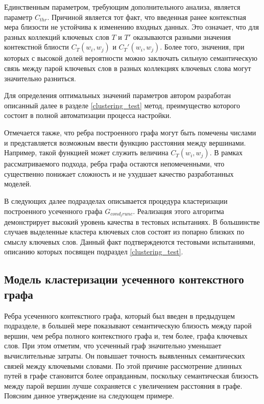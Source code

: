 Единственным параметром, требующим дополнительного анализа, является параметр $C_{thr}$. Причиной является тот факт, что введенная ранее контекстная мера близости не устойчива к изменению входных данных. Это означает, что для разных коллекций ключевых слов $T$ и $T'$ оказываются разными значения контекстной блиости $C_T(w_i, w_j)$ и $C_T'(w_i, w_j)$. Более того, значения, при которых с высокой долей вероятности можно заключать сильную семантическую связь между парой ключевых слов в разных коллекциях ключевых слова могут значительно разниться. 

Для определения оптимальных значений параметров автором разработан описанный далее в разделе \ref{clustering_test} метод, преимущество которого состоит в полной автоматизации процесса настройки. 

Отмечается также, что ребра построенного графа могут быть помечены числами и представляется возможным ввести функцию расстояния между вершинами. Например, такой функцией может служить величина $C_{T}(w_i,w_j)$. В рамках рассматриваемого подхода, ребра графа остаются непомеченными, что существенно понижает сложность и не ухудшает качество разработанных моделей.

В следующих далее подразделах описывается процедура кластеризации построенного усеченного графа $G_{cond_trunc}$. Реализация этого алгоритма демонстрирует высокий уровень качества в тестовых испытаниях. В большинстве случаев выделенные кластера ключевых слов состоят из попарно близких по смыслу ключевых слов. Данный факт подтверждеются тестовыми испытаниями, описанию которых посвящен подраздел \ref{clustering_test}.

\subsection{Модель кластеризации усеченного контекстного графа} \label{clustering_procedure}
Ребра усеченного контекстного графа, который был введен в предыдущем подразделе, в большей мере показывают семантическую близость между парой вершин, чем ребра полного контекстного графа и, тем более, графа ключевых слов. При этом отметим, что усеченный граф значительно уменьшает вычислительные затраты. Он повышает точность выявленных семантических связей между ключевыми словами. По этой причине рассмотрение длинных путей в графе становится более оправданным, поскольку семантическая близость между парой вершин лучше сохраняется с увеличением расстояния в графе.  Поясним данное утверждение на следующем примере.


